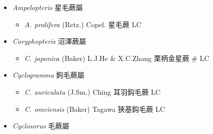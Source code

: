 
  \begin{itemize}
 \item[] \textit{Ampelopteris} 星毛蕨屬
                                
  \begin{itemize}
        \item[] \textit{A. prolifera} (Retz.) Copel.  星毛蕨   LC
  \end{itemize}
 \item[] \textit{Coryphopteris} 沼澤蕨屬
                                
  \begin{itemize}
        \item[] \textit{C. japonica} (Baker) L.J.He \& X.C.Zhang  栗柄金星蕨  \# LC
  \end{itemize}
 \item[] \textit{Cyclogramma} 鉤毛蕨屬
                                
  \begin{itemize}
        \item[] \textit{C. auriculata} (J.Sm.) Ching  耳羽鈎毛蕨   LC
        \item[] \textit{C. omeiensis} (Baker) Tagawa  狹基鈎毛蕨   LC
  \end{itemize}
 \item[] \textit{Cyclosorus} 毛蕨屬
                                

\end{itemize}
